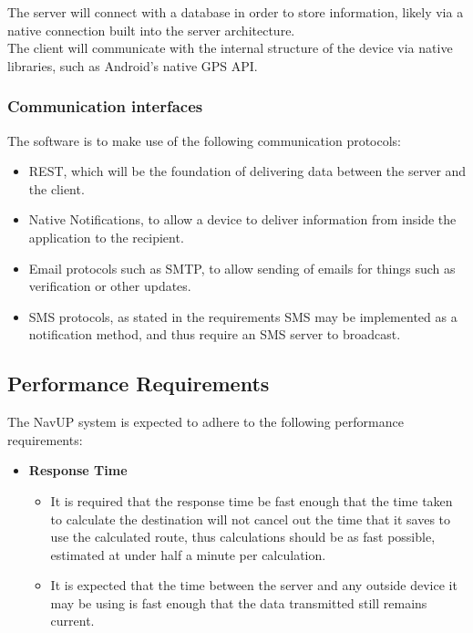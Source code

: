 \documentclass{article}
\begin{document}
			The server will connect with a database in order to store information, likely via a native connection built into the server architecture.\\
			
			The client will communicate with the internal structure of the device via native libraries, such as Android's native GPS API.
			
			\subsubsection{Communication interfaces}
			
			The software is to make use of the following communication protocols:
			
				\begin{itemize}
					\item REST, which will be the foundation of delivering data between the server and the client.
					\item Native Notifications, to allow a device to deliver information from inside the application to the recipient.
					\item Email protocols such as SMTP, to allow sending of emails for things such as verification or other updates.
					\item SMS protocols, as stated in the requirements SMS may be implemented as a notification method, and thus require an SMS server to broadcast.
				\end{itemize}
		
		\pagebreak
		
		\subsection{Performance Requirements}
		
		The NavUP system is expected to adhere to the following performance requirements:
		
			\begin{itemize}
				
				\item \textbf{Response Time}
					\begin{itemize}
						\item It is required that the response time be fast enough that the time taken to calculate the destination will not cancel out the time that it saves to use the calculated route, thus calculations should be as fast possible, estimated at under half a minute per calculation.
						\item It is expected that the time between the server and any outside device it may be using is fast enough that the data transmitted still remains current.
					\end{itemize}

			\end{itemize}
		
\end{document}
